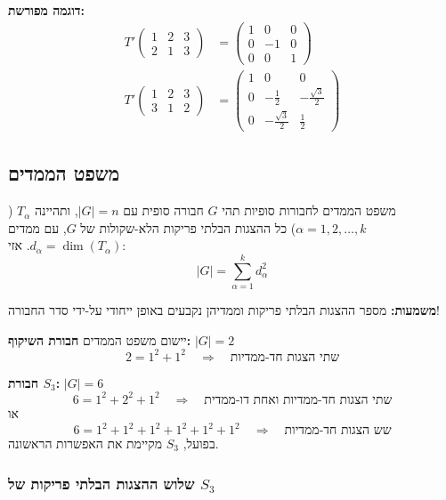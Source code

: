 \textbf{דוגמה מפורשת:}
\begin{align*}
T'\begin{pmatrix} 1 & 2 & 3 \\ 2 & 1 & 3 \end{pmatrix} &= 
\begin{pmatrix} 1 & 0 & 0 \\ 0 & -1 & 0 \\ 0 & 0 & 1 \end{pmatrix} \\
T'\begin{pmatrix} 1 & 2 & 3 \\ 3 & 1 & 2 \end{pmatrix} &=
\begin{pmatrix} 1 & 0 & 0 \\ 0 & -\frac{1}{2} & -\frac{\sqrt{3}}{2} \\ 0 & -\frac{\sqrt{3}}{2} & \frac{1}{2} \end{pmatrix}
\end{align*}

\subsection{משפט הממדים}

\begin{theorembox}[label=thm:dimension]{משפט הממדים לחבורות סופיות}
תהי $G$ חבורה סופית עם $|G| = n$, ותהיינה $T_\alpha$ ($\alpha = 1, 2, \ldots, k$) כל ההצגות הבלתי פריקות הלא-שקולות של $G$, עם ממדים $d_\alpha = \dim(T_\alpha)$. אזי:
\[
\boxed{|G| = \sum_{\alpha=1}^{k} d_\alpha^2}
\]
\end{theorembox}

\textbf{משמעות:} מספר ההצגות הבלתי פריקות וממדיהן נקבעים באופן ייחודי על-ידי סדר החבורה!

\begin{examplebox}[label=ex:dimension_theorem]{יישום משפט הממדים}
\textbf{חבורת השיקוף:} $|G| = 2$
\[
2 = 1^2 + 1^2 \quad \Rightarrow \quad \text{שתי הצגות חד-ממדיות}
\]

\textbf{חבורת $S_3$:} $|G| = 6$
\[
6 = 1^2 + 2^2 + 1^2 \quad \Rightarrow \quad \text{שתי הצגות חד-ממדיות ואחת דו-ממדית}
\]
או
\[
6 = 1^2 + 1^2 + 1^2 + 1^2 + 1^2 + 1^2 \quad \Rightarrow \quad \text{שש הצגות חד-ממדיות}
\]
בפועל, $S_3$ מקיימת את האפשרות הראשונה.
\end{examplebox}

\subsubsection{שלוש ההצגות הבלתי פריקות של $S_3$}

